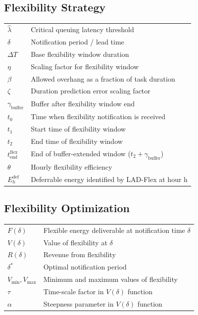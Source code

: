 \documentclass[preprint,12pt]{elsarticle}
\begin{document}
\subsection*{Flexibility Strategy}
\begin{tabular}{ll}
$\hat{\lambda}$ & Critical queuing latency threshold \\
$\delta$ & Notification period / lead time \\
$\Delta T$ & Base flexibility window duration \\
$\eta$ & Scaling factor for flexibility window \\
$\beta$ & Allowed overhang as a fraction of task duration \\
$\zeta$ & Duration prediction error scaling factor \\
$\gamma_{\text{buffer}}$ & Buffer after flexibility window end \\
$t_0$ & Time when flexibility notification is received \\
$t_1$ & Start time of flexibility window \\
$t_2$ & End time of flexibility window \\
$t_{\text{end}}^{\text{flex}}$ & End of buffer-extended window ($t_2 + \gamma_{\text{buffer}}$) \\
$\theta$ & Hourly flexibility efficiency \\
$E_h^{\text{def}}$ & Deferrable energy identified by LAD-Flex at hour h \\
\end{tabular}

\vspace{1em}

\subsection*{Flexibility Optimization}
\begin{tabular}{ll}
$F(\delta)$ & Flexible energy deliverable at notification time $\delta$ \\
$V(\delta)$ & Value of flexibility at $\delta$ \\
$R(\delta)$ & Revenue from flexibility \\
$\delta^*$ & Optimal notification period \\
$V_{\min}, V_{\max}$ & Minimum and maximum values of flexibility \\
$\tau$ & Time-scale factor in $V(\delta)$ function \\
$\alpha$ & Steepness parameter in $V(\delta)$ function \\
\end{tabular}
\end{document}
